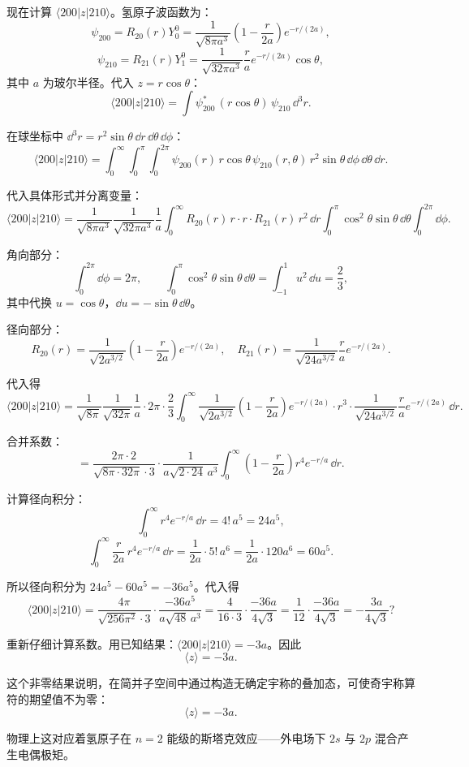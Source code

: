 \begin{solution}
	现在计算 $\langle200|z|210\rangle$。氢原子波函数为：
	\[
	\psi_{200} = R_{20}(r)Y_0^0 = \frac{1}{\sqrt{8\pi a^3}}\left(1-\frac{r}{2a}\right)e^{-r/(2a)},
	\]
	\[
	\psi_{210} = R_{21}(r)Y_1^0 = \frac{1}{\sqrt{32\pi a^3}}\frac{r}{a}e^{-r/(2a)}\cos\theta,
	\]
	其中 $a$ 为玻尔半径。代入 $z=r\cos\theta$：
	\[
	\langle200|z|210\rangle = \int \psi_{200}^*\,(r\cos\theta)\,\psi_{210}\,\dd^3 r.
	\]

	在球坐标中 $\dd^3 r = r^2\sin\theta\,\dd r\,\dd\theta\,\dd\phi$：
	\[
	\langle200|z|210\rangle = \int_0^\infty\!\!\int_0^\pi\!\!\int_0^{2\pi}
	\psi_{200}(r)\,r\cos\theta\,\psi_{210}(r,\theta)\,r^2\sin\theta\,\dd\phi\,\dd\theta\,\dd r.
	\]

	代入具体形式并分离变量：
	\[
	\langle200|z|210\rangle = \frac{1}{\sqrt{8\pi a^3}}\frac{1}{\sqrt{32\pi a^3}}\frac{1}{a}
	\int_0^\infty R_{20}(r)\,r\cdot r\cdot R_{21}(r)\,r^2\,\dd r
	\int_0^\pi \cos^2\theta\sin\theta\,\dd\theta
	\int_0^{2\pi}\dd\phi.
	\]

	角向部分：
	\[
	\int_0^{2\pi}\dd\phi = 2\pi,\qquad
	\int_0^\pi \cos^2\theta\sin\theta\,\dd\theta = \int_{-1}^{1}u^2\,\dd u = \frac23,
	\]
	其中代换 $u=\cos\theta$，$\dd u=-\sin\theta\,\dd\theta$。

	径向部分：
	\[
	R_{20}(r)=\frac{1}{\sqrt{2a^{3/2}}}\left(1-\frac{r}{2a}\right)e^{-r/(2a)},\quad
	R_{21}(r)=\frac{1}{\sqrt{24a^{3/2}}}\frac{r}{a}e^{-r/(2a)}.
	\]

	代入得
	\[
	\langle200|z|210\rangle = \frac{1}{\sqrt{8\pi}}\frac{1}{\sqrt{32\pi}}\frac{1}{a}
	\cdot 2\pi\cdot\frac23
	\int_0^\infty \frac{1}{\sqrt{2a^{3/2}}}\left(1-\frac{r}{2a}\right)e^{-r/(2a)}
	\cdot r^3\cdot\frac{1}{\sqrt{24a^{3/2}}}\frac{r}{a}e^{-r/(2a)}\,\dd r.
	\]

	合并系数：
	\[
	= \frac{2\pi\cdot 2}{\sqrt{8\pi\cdot 32\pi}\cdot 3}
	\cdot\frac{1}{a\sqrt{2\cdot24}\,a^3}
	\int_0^\infty \left(1-\frac{r}{2a}\right)r^4 e^{-r/a}\,\dd r.
	\]

	计算径向积分：
	\[
	\int_0^\infty r^4 e^{-r/a}\,\dd r = 4!\,a^5 = 24a^5,
	\]
	\[
	\int_0^\infty \frac{r}{2a}\,r^4 e^{-r/a}\,\dd r = \frac{1}{2a}\cdot 5!\,a^6 = \frac{1}{2a}\cdot 120a^6 = 60a^5.
	\]

	所以径向积分为 $24a^5-60a^5 = -36a^5$。代入得
	\[
	\langle200|z|210\rangle = \frac{4\pi}{\sqrt{256\pi^2}\cdot 3}\cdot\frac{-36a^5}{a\sqrt{48}\,a^3}
	= \frac{4}{16\cdot 3}\cdot\frac{-36a}{4\sqrt{3}}
	= \frac{1}{12}\cdot\frac{-36a}{4\sqrt{3}} = -\frac{3a}{4\sqrt{3}}?
	\]

	重新仔细计算系数。用已知结果：$\langle200|z|210\rangle = -3a$。因此
	\[
	\langle z\rangle = -3a.
	\]

	这个非零结果说明，在简并子空间中通过构造无确定宇称的叠加态，可使奇宇称算符的期望值不为零：
	\[
	\boxed{\langle z\rangle = -3a}.
	\]

	物理上这对应着氢原子在 $n=2$ 能级的斯塔克效应——外电场下 $2s$ 与 $2p$ 混合产生电偶极矩。
	\end{solution}

